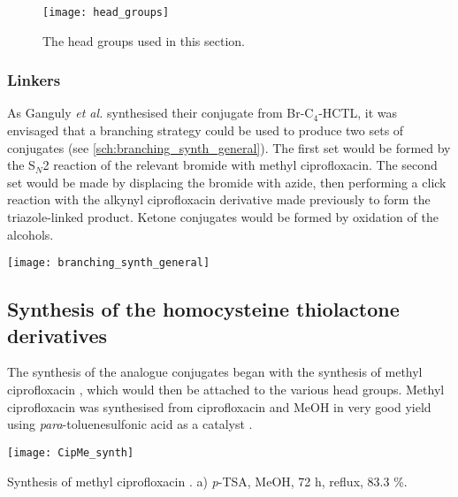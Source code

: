 \begin{figure}[H]
	\begin{center}
		\texttt{[image: head\_groups]}
		\caption{The head groups used in this section.\label{fig:head_groups}}
	\end{center}
\end{figure}

\subsubsection{Linkers}

As Ganguly \textit{et al.}\cite{Ganguly2001} synthesised their conjugate from Br-C$_4$-HCTL, it was envisaged that a branching strategy could be used to produce two sets of conjugates (see \ref{sch:branching_synth_general}). The first set would be formed by the S$_N$2 reaction of the relevant bromide with methyl ciprofloxacin. The second set would be made by displacing the bromide with azide, then performing a click reaction with the alkynyl ciprofloxacin derivative  made previously to form the triazole-linked product. Ketone conjugates would be formed by oxidation of the alcohols.

\begin{scheme}[H]
	\begin{center}
		\texttt{[image: branching\_synth\_general]}
		\caption{\label{sch:branching_synth_general}}
	\end{center}
\end{scheme}

\subsection{Synthesis of the homocysteine thiolactone derivatives\label{sec:HCTL}}

The synthesis of the analogue conjugates began with the synthesis of methyl ciprofloxacin , which would then be attached to the various head groups.
Methyl ciprofloxacin  was synthesised from ciprofloxacin  and MeOH in very good yield using \textit{para}-toluenesulfonic acid as a catalyst \cite{Sachin2010}.

\begin{scheme}[H]
	\begin{center}
		\texttt{[image: CipMe\_synth]}
		\caption{Synthesis of methyl ciprofloxacin . a) \textit{p}-TSA, MeOH, 72 h, reflux, 83.3 \%. \label{sch:CipMe_synth}}
	\end{center}
\end{scheme}

